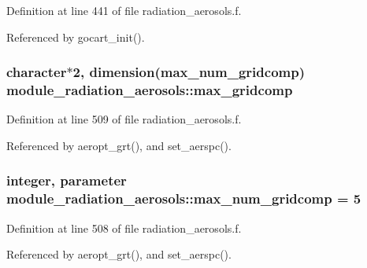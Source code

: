 Definition at line 441 of file radiation\+\_\+aerosols.\+f.



Referenced by gocart\+\_\+init().

\subsubsection[{\texorpdfstring{max\+\_\+gridcomp}{max_gridcomp}}]{\setlength{\rightskip}{0pt plus 5cm}character$\ast$2, dimension({\bf max\+\_\+num\+\_\+gridcomp}) module\+\_\+radiation\+\_\+aerosols\+::max\+\_\+gridcomp\hspace{0.3cm}{\ttfamily [private]}}\hypertarget{namespacemodule__radiation__aerosols_ac8278b0db773d6ba6ab4d71c9bb1b109}{}\label{namespacemodule__radiation__aerosols_ac8278b0db773d6ba6ab4d71c9bb1b109}


Definition at line 509 of file radiation\+\_\+aerosols.\+f.



Referenced by aeropt\+\_\+grt(), and set\+\_\+aerspc().

\subsubsection[{\texorpdfstring{max\+\_\+num\+\_\+gridcomp}{max_num_gridcomp}}]{\setlength{\rightskip}{0pt plus 5cm}integer, parameter module\+\_\+radiation\+\_\+aerosols\+::max\+\_\+num\+\_\+gridcomp = 5\hspace{0.3cm}{\ttfamily [private]}}\hypertarget{namespacemodule__radiation__aerosols_ad1187b5d87889c68cbe5929e20e83ac7}{}\label{namespacemodule__radiation__aerosols_ad1187b5d87889c68cbe5929e20e83ac7}


Definition at line 508 of file radiation\+\_\+aerosols.\+f.



Referenced by aeropt\+\_\+grt(), and set\+\_\+aerspc().

